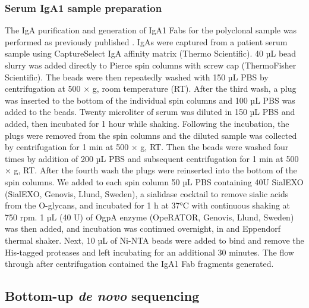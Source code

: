 \subsubsection{Serum IgA1 sample preparation}
The IgA purification and generation of IgA1 Fabs for the polyclonal sample was performed as previously published \cite{bondt2021direct}. IgAs were captured from a patient serum sample using CaptureSelect IgA affinity matrix (Thermo Scientific). 40 µL bead slurry was added directly to Pierce spin columns with screw cap (ThermoFisher Scientific). The beads were then repeatedly washed with 150 µL PBS by centrifugation at 500 × g, room temperature (RT). After the third wash, a plug was inserted to the bottom of the individual spin columns and 100 µL PBS was added to the beads. Twenty microliter of serum was diluted in 150 µL PBS and added, then incubated for 1 hour while shaking. Following the incubation, the plugs were removed from the spin columns and the diluted sample was collected by centrifugation for 1 min at 500 × g, RT. Then the beads were washed four times by addition of 200 µL PBS and subsequent centrifugation for 1 min at 500 × g, RT. After the fourth wash the plugs were reinserted into the bottom of the spin columns. We added to each spin column 50 µL PBS containing 40U SialEXO (SialEXO, Genovis, Llund, Sweden), a sialidase cocktail to remove sialic acids from the O-glycans, and incubated for 1 h at 37°C with continuous shaking at 750 rpm. 1 µL (40 U) of OgpA enzyme (OpeRATOR, Genovis, Llund, Sweden) was then added, and incubation was continued overnight, in and Eppendorf thermal shaker. Next, 10 µL of Ni-NTA beads were added to bind and remove the His-tagged proteases and left incubating for an additional 30 minutes. The flow through after centrifugation contained the IgA1 Fab fragments generated.

\subsection{Bottom-up \emph{de novo} sequencing}

